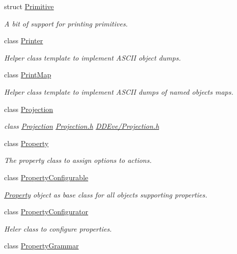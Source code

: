 \begin{DoxyCompactItemize}
struct \hyperlink{struct_d_d4hep_1_1_primitive}{Primitive}
\begin{DoxyCompactList}\small\item\em A bit of support for printing primitives. \end{DoxyCompactList}\item 
class \hyperlink{struct_d_d4hep_1_1_printer}{Printer}
\begin{DoxyCompactList}\small\item\em Helper class template to implement A\+S\+C\+II object dumps. \end{DoxyCompactList}\item 
class \hyperlink{struct_d_d4hep_1_1_print_map}{Print\+Map}
\begin{DoxyCompactList}\small\item\em Helper class template to implement A\+S\+C\+II dumps of named objects maps. \end{DoxyCompactList}\item 
class \hyperlink{class_d_d4hep_1_1_projection}{Projection}
\begin{DoxyCompactList}\small\item\em class \hyperlink{class_d_d4hep_1_1_projection}{Projection} \hyperlink{_projection_8h}{Projection.\+h} \hyperlink{_projection_8h}{D\+D\+Eve/\+Projection.\+h} \end{DoxyCompactList}\item 
class \hyperlink{class_d_d4hep_1_1_property}{Property}
\begin{DoxyCompactList}\small\item\em The property class to assign options to actions. \end{DoxyCompactList}\item 
class \hyperlink{class_d_d4hep_1_1_property_configurable}{Property\+Configurable}
\begin{DoxyCompactList}\small\item\em \hyperlink{class_d_d4hep_1_1_property}{Property} object as base class for all objects supporting properties. \end{DoxyCompactList}\item 
class \hyperlink{class_d_d4hep_1_1_property_configurator}{Property\+Configurator}
\begin{DoxyCompactList}\small\item\em Heler class to configure properties. \end{DoxyCompactList}\item 
class \hyperlink{class_d_d4hep_1_1_property_grammar}{Property\+Grammar}

\end{DoxyCompactItemize}

